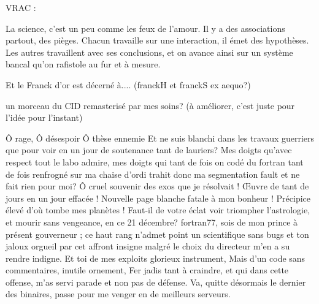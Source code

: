 


VRAC : 

La science, c'est un peu comme les feux de l'amour. Il y a des associations partout, des pièges. Chacun travaille sur une interaction, il émet des hypothèses. Les autres travaillent avec ses conclusions, et on avance ainsi sur un système bancal qu'on rafistole au fur et à mesure.

Et le Franck d'or est décerné à.... (franckH et franckS ex aequo?)

un morceau du CID remasterisé par mes soins? (à améliorer, c'est juste pour l'idée pour l'instant)


Ô rage, Ô désespoir Ô thèse ennemie
Et ne suis blanchi dans les travaux guerriers
que pour voir en un jour de soutenance tant de lauriers? 
Mes doigts qu'avec respect tout le labo admire, 
mes doigts qui tant de fois on codé du fortran
tant de fois renfrogné sur ma chaise d'ordi
trahit donc ma segmentation fault et ne fait rien pour moi? 
Ô cruel souvenir des exos que je résolvait !
Œuvre de tant de jours en un jour effacée !
Nouvelle page blanche fatale à mon bonheur !
Précipice élevé d'où tombe mes planètes !
Faut-il de votre éclat voir triompher l'astrologie, 
et mourir sans vengeance, en ce 21 décembre? 
fortran77, sois de mon prince à présent gouverneur ; 
ce haut rang n'admet point un scientifique sans bugs
et ton jaloux orgueil par cet affront insigne
malgré le choix du directeur m'en a su rendre indigne. 
Et toi de mes exploits glorieux instrument, 
Mais d'un code sans commentaires, inutile ornement, 
Fer jadis tant à craindre, et qui dans cette offense, 
m'as servi parade et non pas de défense. 
Va, quitte désormais le dernier des binaires,
passe pour me venger en de meilleurs serveurs.
